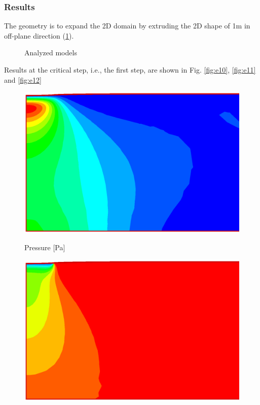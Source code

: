 \subsubsection*{Results}
 The geometry is to expand the 2D domain
  by extruding the 2D shape of 1m in off-plane direction (\ref{fig_HM3}).
\begin{figure}[!htb]
  \begin{center}
  \end{center}
  \caption{Analyzed models}
  \label{fig_HM3}
\end{figure}
 Results at the critical step, i.e., the first step, are shown in Fig. \ref{fig:e10},  \ref{fig:e11}
 and  \ref{fig:e12}
\begin{figure}[!thb]
  \begin{center}
   \begin{minipage}[t]{0.45\textwidth}
     \begin{center}
    \includegraphics[scale=0.3]{HM/HM3D/pre.eps}
    \centerline{Pressure [Pa]}
    \end{center}
   \end{minipage}
   \begin{minipage}[t]{0.45\textwidth}
    \begin{center}
    \includegraphics[scale=0.3]{HM/HM3D/stress_yy.eps}\\

\end{center}
\end{minipage}
\end{center}
\end{figure}
